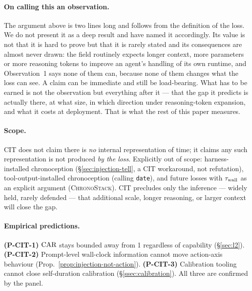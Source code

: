 \paragraph{On calling this an observation.} The argument above is two lines
long and follows from the definition of the loss. We do not present it as a
deep result and have named it accordingly. Its value is not that it is hard to
prove but that it is rarely stated and its consequences are almost never drawn:
the field routinely expects longer context, more parameters or more reasoning
tokens to improve an agent's handling of its own runtime, and Observation~1
says none of them can, because none of them changes what the loss can see. A
claim can be immediate and still be load-bearing. What has to be earned is not
the observation but everything after it --- that the gap it predicts is
actually there, at what size, in which direction under reasoning-token
expansion, and what it costs at deployment. That is what the rest of this paper
measures.

\paragraph{Scope.} CIT does not claim there is \emph{no} internal representation of time; it claims any such representation is not produced \emph{by the loss}. Explicitly out of scope: harness-installed chronoception (\S\ref{sec:injection-tell}, a CIT workaround, not refutation), tool-output-installed chronoception (calling \texttt{date}), and future losses with $\tau_{\mathrm{wall}}$ as an explicit argument (\textsc{ChronoStack}). CIT precludes only the inference --- widely held, rarely defended --- that additional scale, longer reasoning, or larger context will close the gap.

\paragraph{Empirical predictions.} \textbf{(P-CIT-1)} $\mathrm{CAR}$ stays bounded away from 1 regardless of capability (\S\ref{sec:l2}). \textbf{(P-CIT-2)} Prompt-level wall-clock information cannot move action-axis behaviour (Prop.~\ref{prop:injection-not-action}). \textbf{(P-CIT-3)} Calibration tooling cannot close self-duration calibration (\S\ref{ssec:calibration}). All three are confirmed by the panel.

